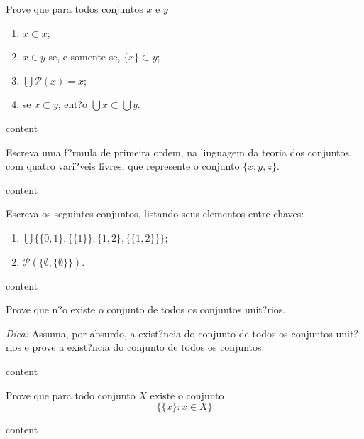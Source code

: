 \begin{exercicio}
	Prove que para todos conjuntos $x$ e $y$
	\begin{enumerate}[label=(\alph{*})]
		\item $x\subset x$;
		\item $x\in y$ se, e somente se, $\{x\}\subset y$;
		\item $\bigcup\mathcal{P}(x)=x$;
		\item se $x\subset y$, ent?o $\bigcup x\subset \bigcup y$.
	\end{enumerate}
\end{exercicio}
\begin{solucao}
	content
\end{solucao}

\begin{exercicio}
	Escreva uma f?rmula de primeira ordem, na linguagem da teoria dos conjuntos, com quatro vari?veis livres, que represente o conjunto $\{x,y,z\}$.
\end{exercicio}
\begin{solucao}
	content
\end{solucao}

\begin{exercicio}
	Escreva os seguintes conjuntos, listando seus elementos entre chaves:
	\begin{enumerate}[label=(\alph{*})]
		\item $\bigcup\{\{0,1\},\{\{1\}\},\{1,2\},\{\{1,2\}\}\}$;
		\item $\mathcal{P}(\{\emptyset,\{\emptyset\}\})$.
	\end{enumerate}
\end{exercicio}
\begin{solucao}
	content
\end{solucao}

\begin{exercicio}
	Prove que n?o existe o conjunto de todos os conjuntos unit?rios.

	\emph{Dica:} Assuma, por absurdo, a exist?ncia do conjunto de todos os conjuntos unit?rios e prove a exist?ncia do conjunto de todos os conjuntos.
\end{exercicio}
\begin{solucao}
	content
\end{solucao}

\begin{exercicio}
	Prove que para todo conjunto $X$ existe o conjunto
	$$\{\{x\}:x\in X\}$$
\end{exercicio}
\begin{solucao}
	content
\end{solucao}

